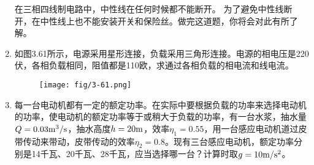 \begin{enumerate}
    在三相四线制电路中，中性线在任何时候都不能断开。
    为了避免中性线断开，在中性线上也不能安装开关和保险丝。做完这道题，你将会对此有所了解。
    \item 如图3.61所示，电源采用星形连接，负载采用三角形连接。电源的相电压是220伏，各相负载相同，阻值都是110欧，求通过各相负载的相电流和线电流。
\begin{figure}[htp]\centering
\texttt{[image: fig/3-61.png]}
\caption{}
\end{figure}
    \item 每一台电动机都有一定的额定功率。在实际中要根据负载的功率来选择电动机的功率，使电动机的额定功率等于或稍大于负载的功率，有一台水浆，抽水量$Q=0.03{\rm m^3}/{\rm s}$，抽水高度$h=20{\rm m}$，效率$\eta_1=0.55$，用一台感应电动机道过皮带传动来带动，皮带传动的效率$\eta_2=0.8$。现有三台感应电动机，额定功率分别是14千瓦、20千瓦、28千瓦，应当选择哪一台？计算时取$g=10\text{m}/\text{s}^2$。
\end{enumerate}

































